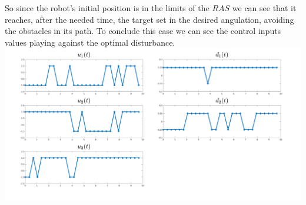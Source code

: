     So since the robot's initial position is in the limits of the $RAS$ we can see that it reaches, after the needed time, the target set in the desired angulation, avoiding the obstacles in its path. To conclude this case we can see the control inputs values playing against the optimal disturbance.
    \includegraphics[scale=0.18]{figures/staticCONTROL1.png}
